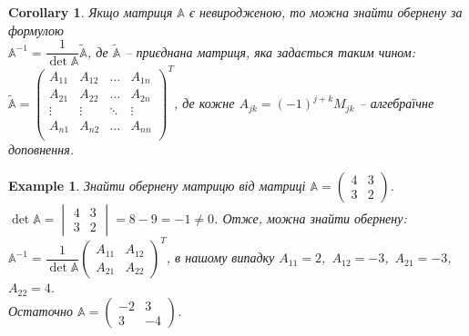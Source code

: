 \documentclass[a4paper, 10pt]{article}
\theoremstyle{theoremdd}
\newtheorem{example}[theorem]{Example}
\newtheorem{corollary}[theorem]{Corollary}
\begin{document}
\begin{corollary}
Якщо матриця $\mathbb{A}$ є невиродженою, то можна знайти обернену за формулою \\ $\mathbb{A}^{-1} = \dfrac{1}{\det \mathbb{A}} \widetilde{\mathbb{A}}$, де $\widetilde{\mathbb{A}}$ -- приєднана матриця, яка задається таким чином:\\
$\widetilde{\mathbb{A}} = \begin{pmatrix}
A_{11} & A_{12} & \dots & A_{1n} \\
A_{21} & A_{22} & \dots & A_{2n} \\
\vdots & \vdots & \ddots & \vdots \\
A_{n1} & A_{n2} & \dots & A_{nn} \\
\end{pmatrix}^T$, де кожне $A_{jk} = (-1)^{j+k}M_{jk}$ -- алгебраїчне доповнення.
\end{corollary}

\begin{example}
Знайти обернену матрицю від матриці $\mathbb{A} = \begin{pmatrix}
4 & 3 \\
3 & 2
\end{pmatrix}$.\\
$\det \mathbb{A} = \begin{vmatrix}
4 & 3 \\
3 & 2
\end{vmatrix} = 8-9 = -1 \neq 0$. Отже, можна знайти обернену:\\
$\mathbb{A}^{-1} = \dfrac{1}{\det \mathbb{A}} \begin{pmatrix}
A_{11} & A_{12} \\
A_{21} & A_{22}
\end{pmatrix}^T$, в нашому випадку $A_{11} = 2$,\ $A_{12} = -3$,\ $A_{21} = -3$,\ $A_{22}=4$.\\
Остаточно $\mathbb{A} = \begin{pmatrix}
-2 & 3 \\
3 & -4
\end{pmatrix}$.
\end{example}
\end{document}
